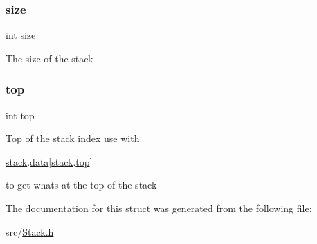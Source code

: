 \subsubsection{\texorpdfstring{size}{size}}
{\footnotesize\ttfamily int size}

The size of the stack \mbox{\label{structstack_af93f4f37fc2ad9c37af4a715423b110c}} 
\subsubsection{\texorpdfstring{top}{top}}
{\footnotesize\ttfamily int top}

Top of the stack index use with
\begin{DoxyCode}
\hyperlink{structstack}{stack}.\hyperlink{structstack_ac103627c1ad15cbec2f22d0abe6d54b6}{data}[\hyperlink{structstack}{stack}.\hyperlink{structstack_af93f4f37fc2ad9c37af4a715423b110c}{top}] 
\end{DoxyCode}
 to get what\textquotesingle{}s at the top of the stack 

The documentation for this struct was generated from the following file\+:\begin{DoxyCompactItemize}
\item 
src/\hyperlink{_stack_8h}{Stack.\+h}\end{DoxyCompactItemize}
